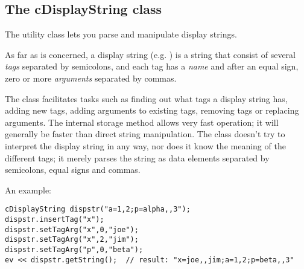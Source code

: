 \subsection{The cDisplayString class}

The  utility class lets you parse and
manipulate display strings.

As far as  is concerned, a display string
(e.g. ) is a string that consist of several
\textit{tags} separated by semicolons, and each tag has a \textit{name}
and after an equal sign, zero or more \textit{arguments} separated by commas.

The class facilitates tasks such as finding out what tags a display string
has, adding new tags, adding arguments to existing tags,
removing tags or replacing arguments. The internal storage method allows
very fast operation; it will generally be faster than direct string manipulation.
The class doesn't try to interpret the display string in any way, nor does
it know the meaning of the different tags; it merely parses the string
as data elements separated by semicolons, equal signs and commas.

An example:

\begin{Verbatim}
cDisplayString dispstr("a=1,2;p=alpha,,3");
dispstr.insertTag("x");
dispstr.setTagArg("x",0,"joe");
dispstr.setTagArg("x",2,"jim");
dispstr.setTagArg("p",0,"beta");
ev << dispstr.getString();  // result: "x=joe,,jim;a=1,2;p=beta,,3"
\end{Verbatim}




